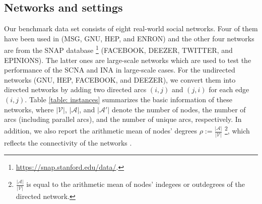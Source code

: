 \documentclass[a4paper,10pt]{article}
\theoremstyle{plain}
\newcommand{\revv}[1]{{#1}}
\begin{document}
{	\subsection{Networks and settings}
	\label{settings}
	Our benchmark data set consists of eight real-world social networks. Four of them have been used in \cite{Guney2020,Wu2017} (MSG, GNU, HEP, and ENRON) and the other four networks are from the SNAP database \footnote{\url{https://snap.stanford.edu/data/}.}
	(FACEBOOK, DEEZER, TWITTER, and EPINIONS).
	The latter ones are large-scale networks  which are used to test the performance of the SCNA and INA in large-scale cases.
	For the undirected networks (GNU, HEP, FACEBOOK, and DEEZER), we convert them into directed networks by adding two directed arcs $(i,j)$ and $(j,i)$ for each edge $(i,j)$.
	\revv{Table \ref{table: instances} summarizes the basic information of these networks, where $|\mathcal{V}|$,  $|\mathcal{A}|$, and $|\mathcal{A}'|$ denote the number of nodes, the number of arcs (including parallel arcs), and  the number of unique arcs, respectively.
		In addition, we also report the arithmetic mean of nodes' degrees  $\rho:=\frac{|\mathcal{A}|}{|\mathcal{V}|}$ \footnote{\revv{$\frac{|\mathcal{A}|}{|\mathcal{V}|}$ is equal to the arithmetic mean of nodes' indegees or outdegrees of the directed network.}}, which reflects the connectivity of the networks \cite{Beineke2002,Cheung2021}.
	}%
	
}
\end{document}
